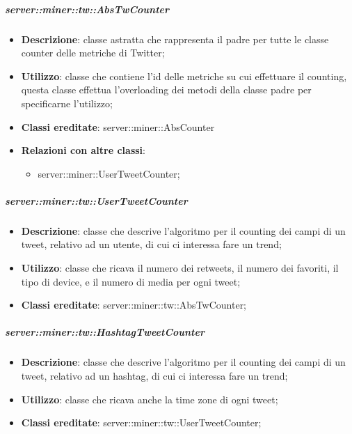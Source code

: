	\subparagraph{server::miner::tw::AbsTwCounter} %
		\label{subp:server_miner_tw_AbsTwCounter}
			\begin{itemize}
				\item \textbf{Descrizione}: classe astratta che rappresenta il padre per tutte le classe counter delle metriche di Twitter;
				\item \textbf{Utilizzo}: classe che contiene l’id delle metriche su cui effettuare il counting, questa classe effettua l’overloading dei metodi della classe padre per specificarne l’utilizzo;
				\item \textbf{Classi ereditate}: server::miner::AbsCounter
				\item \textbf{Relazioni con altre classi}:
					\begin{itemize}
						\item server::miner::UserTweetCounter;
					\end{itemize}
			\end{itemize}
		
	\subparagraph{server::miner::tw::UserTweetCounter} %
		\label{subp:server_miner_tw_UserTweetCounter}
			\begin{itemize}
				\item \textbf{Descrizione}: classe che descrive l'algoritmo per il counting dei campi di un tweet, relativo ad un utente, di cui ci interessa fare un trend;
				\item \textbf{Utilizzo}: classe che ricava il numero dei retweets, il numero dei favoriti, il tipo di device, e il numero di media per ogni tweet;
				\item \textbf{Classi ereditate}: server::miner::tw::AbsTwCounter;
			\end{itemize}
		
		
	\subparagraph{server::miner::tw::HashtagTweetCounter} %
		\label{subp:server_miner_tw_HashtagTweetCounter}
			\begin{itemize}
				\item \textbf{Descrizione}: classe che descrive l'algoritmo per il counting dei campi di un tweet, relativo ad un hashtag, di cui ci interessa fare un trend;
				\item \textbf{Utilizzo}: classe che ricava anche la time zone di ogni tweet;
				\item \textbf{Classi ereditate}: server::miner::tw::UserTweetCounter;
			\end{itemize}

